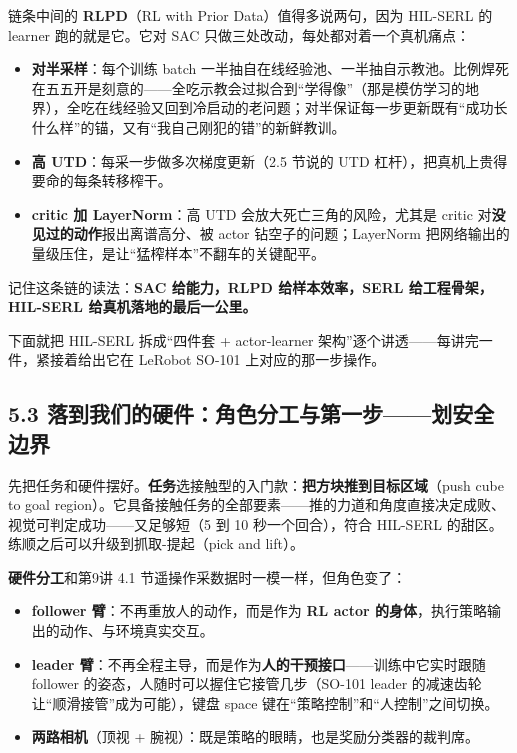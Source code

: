 \documentclass[
  chinese,
]{ctexart}
\providecommand{\tightlist}{%
  \setlength{\itemsep}{0pt}\setlength{\parskip}{0pt}}
\begin{document}
链条中间的 \textbf{RLPD}（RL with Prior Data）值得多说两句，因为
HIL-SERL 的 learner 跑的就是它。它对 SAC
只做三处改动，每处都对着一个真机痛点：

\begin{itemize}
\tightlist
\item
  \textbf{对半采样}：每个训练 batch
  一半抽自在线经验池、一半抽自示教池。比例焊死在五五开是刻意的------全吃示教会过拟合到``学得像''（那是模仿学习的地界），全吃在线经验又回到冷启动的老问题；对半保证每一步更新既有``成功长什么样''的锚，又有``我自己刚犯的错''的新鲜教训。
\item
  \textbf{高 UTD}：每采一步做多次梯度更新（2.5 节说的 UTD
  杠杆），把真机上贵得要命的每条转移榨干。
\item
  \textbf{critic 加 LayerNorm}：高 UTD 会放大死亡三角的风险，尤其是
  critic 对\textbf{没见过的动作}报出离谱高分、被 actor
  钻空子的问题；LayerNorm
  把网络输出的量级压住，是让``猛榨样本''不翻车的关键配平。
\end{itemize}

记住这条链的读法：\textbf{SAC 给能力，RLPD 给样本效率，SERL
给工程骨架，HIL-SERL 给真机落地的最后一公里。}

下面就把 HIL-SERL 拆成``四件套 + actor-learner
架构''逐个讲透------每讲完一件，紧接着给出它在 LeRobot SO-101
上对应的那一步操作。

\subsection{5.3
落到我们的硬件：角色分工与第一步------划安全边界}\label{ux843dux5230ux6211ux4eecux7684ux786cux4ef6ux89d2ux8272ux5206ux5de5ux4e0eux7b2cux4e00ux6b65ux5212ux5b89ux5168ux8fb9ux754c}

先把任务和硬件摆好。\textbf{任务}选接触型的入门款：\textbf{把方块推到目标区域}（push
cube to goal
region）。它具备接触任务的全部要素------推的力道和角度直接决定成败、视觉可判定成功------又足够短（5
到 10 秒一个回合），符合 HIL-SERL
的甜区。练顺之后可以升级到抓取-提起（pick and lift）。

\textbf{硬件分工}和第9讲 4.1 节遥操作采数据时一模一样，但角色变了：

\begin{itemize}
\tightlist
\item
  \textbf{follower 臂}：不再重放人的动作，而是作为 \textbf{RL actor
  的身体}，执行策略输出的动作、与环境真实交互。
\item
  \textbf{leader
  臂}：不再全程主导，而是作为\textbf{人的干预接口}------训练中它实时跟随
  follower 的姿态，人随时可以握住它接管几步（SO-101 leader
  的减速齿轮让``顺滑接管''成为可能），键盘 space
  键在``策略控制''和``人控制''之间切换。
\item
  \textbf{两路相机}（顶视 +
  腕视）：既是策略的眼睛，也是奖励分类器的裁判席。
\end{itemize}
\end{document}
